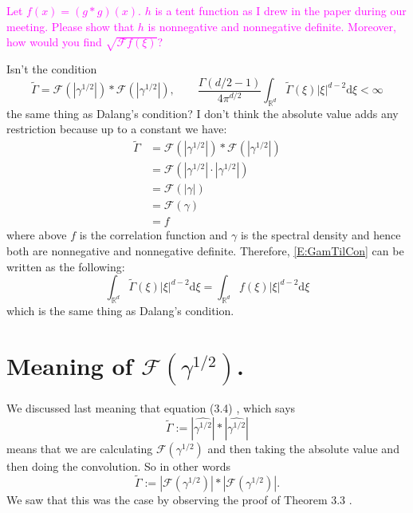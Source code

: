 \documentclass{article}
\numberwithin{equation}{section}
\newcommand{\R}{\mathbb{R}}
\newcommand{\ud}{\ensuremath{\mathrm{d}}}
\begin{document}
\bigskip

\textcolor{magenta}{Let $f(x) = (g*g)(x)$.  $h$ is a tent function as I drew in the paper during our
meeting. Please show that $h$ is nonnegative and nonnegative definite. Moreover, how would you find
$\sqrt{\mathcal{F}f (\xi)}$?}

Isn't the condition
	\begin{equation}\label{E:GamTilCon}
	\tilde{\Gamma} = \mathcal{F}(|\gamma^{1/2}|) * \mathcal{F}(|\gamma^{1/2}|), \quad \quad \frac{\Gamma(d/2 -1 )}{4 \pi^{d/2}} \int_{\R^d} \tilde{\Gamma}(\xi) |\xi|^{d-2} \ud \xi < \infty
	\end{equation}
the same thing as Dalang's condition? I don't think the absolute value adds any restriction because up to a constant we have:
	\begin{align*}
			\tilde{\Gamma} &= \mathcal{F}(|\gamma^{1/2}|) * \mathcal{F}(|\gamma^{1/2}|)
			\\ &= \mathcal{F}\left( |\gamma^{1/2}| \cdot |\gamma^{1/2}| \right)
			\\& = \mathcal{F}( |\gamma| )
			\\& = \mathcal{F}( \gamma )
			\\& = f
	\end{align*}
where above $f$ is the correlation function and $\gamma$ is the spectral density and hence both are nonnegative and nonnegative definite. Therefore, \eqref{E:GamTilCon} can be written as the following:
	\[
		\int_{\R^d} \tilde{\Gamma}(\xi) |\xi|^{d-2} \ud \xi = 	\int_{\R^d} f(\xi) |\xi|^{d-2} \ud \xi
	\]
which is the same thing as Dalang's condition.

\section{Meaning of $\mathcal{F}(\gamma^{1/2})$.}
We discussed last meaning that equation (3.4) \cite{TZ98}, which says
	\[
		\tilde{\Gamma} := |\widehat{\gamma^{1/2}}|*|\widehat{\gamma^{1/2}}|
	\]
means that we are calculating $\mathcal{F}(\gamma^{1/2})$ and then taking the absolute value and then doing the convolution. So in other words
	\begin{equation}\label{E:GamTil}
			\tilde{\Gamma} := |\mathcal{F}(\gamma^{1/2})|* |\mathcal{F}(\gamma^{1/2})|.
	\end{equation}
We saw that this was the case by observing the proof of Theorem 3.3 \cite{TZ98}.
\end{document}
